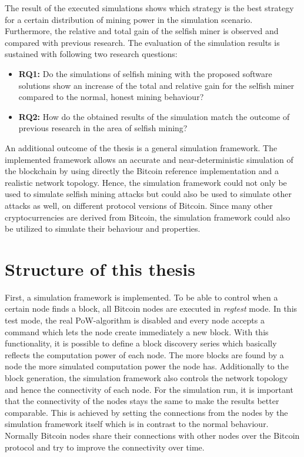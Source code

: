 The result of the executed simulations shows which strategy is the best strategy for a certain distribution of mining power in the simulation scenario.
Furthermore, the relative and total gain of the selfish miner is observed and compared with previous research.
The evaluation of the simulation results is sustained with following two research questions:

\begin{itemize}
	\item \textbf{RQ1:} Do the simulations of selfish mining with the proposed software solutions show an increase of the total and relative gain for the selfish miner compared to the normal, honest mining behaviour?

	\item \textbf{RQ2:} How do the obtained results of the simulation match the outcome of previous research in the area of selfish mining?
\end{itemize}


An additional outcome of the thesis is a general simulation framework.
The implemented framework allows an accurate and near-deterministic simulation of the blockchain by using directly the Bitcoin reference implementation and a realistic network topology.
Hence, the simulation framework could not only be used to simulate selfish mining attacks but could also be used to simulate other attacks as well, on different protocol versions of Bitcoin. 
Since many other cryptocurrencies are derived from Bitcoin, the simulation framework could also be utilized to simulate their behaviour and properties.

\section{Structure of this thesis}


First, a simulation framework is implemented.
To be able to control when a certain node finds a block, all Bitcoin nodes are executed in \textit{regtest} mode.
In this test mode, the real PoW-algorithm is disabled and every node accepts a command which lets the node create immediately a new block.
With this functionality, it is possible to define a block discovery series which basically reflects the computation power of each node.
The more blocks are found by a node the more simulated computation power the node has.
Additionally to the block generation, the simulation framework also controls the network topology and hence the connectivity of each node.
For the simulation run, it is important that the connectivity of the nodes stays the same to make the results better comparable.
This is achieved by setting the connections from the nodes by the simulation framework itself which is in contrast to the normal behaviour.
Normally Bitcoin nodes share their connections with other nodes over the Bitcoin protocol and try to improve the connectivity over time.

